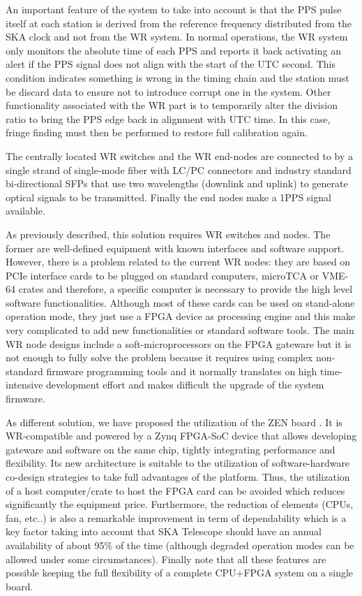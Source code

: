  
An important feature of the system to take into account is that the PPS pulse itself at each station is derived from the reference frequency distributed from the SKA clock and not from the WR system. In normal operations, the WR system only monitors the absolute time of each PPS and reports it back activating an alert if the PPS signal does not align with the start of the UTC second. This condition indicates something is wrong in the timing chain and the station must be discard data to ensure not to introduce corrupt one in the system. Other functionality associated with the WR part is to temporarily alter the division ratio to bring the PPS edge back in alignment with UTC time. In this case, fringe finding must then be performed to restore full calibration again.

The centrally located WR switches and the WR end-nodes are connected to by a single strand of single-mode fiber with LC/PC connectors and industry standard bi-directional SFPs that use two wavelengths (downlink and uplink) to generate optical signals to be transmitted. Finally the end nodes make a 1PPS signal available. 

As previously described, this solution requires WR switches and nodes. The former are well-defined equipment with known interfaces and software support. However, there is a problem related to the current WR nodes: they are based on PCIe interface cards to be plugged on standard computers, microTCA or VME-64 crates and therefore, a specific computer is necessary to provide the high level software functionalities. Although most of these cards can be used on stand-alone operation mode, they just use a FPGA device as processing engine and this make very complicated to add new functionalities or standard software tools. The main WR node designs include a soft-microprocessors on the FPGA gateware but it is not enough to fully solve the problem because it requires using complex non-standard firmware programming tools and it normally translates on high time-intensive development effort and makes difficult the upgrade of the system firmware.

As different solution, we have proposed the utilization of the ZEN board \cite{sevensols:wr_zen}. It is WR-compatible and powered by a Zynq FPGA-SoC device \cite{xilinx:zynq} that allows developing gateware and software on the same chip, tightly integrating performance and flexibility. Its new architecture is suitable to the utilization of software-hardware co-design strategies to take full advantages of the platform. Thus, the utilization of a host computer/crate to host the FPGA card can be avoided which reduces significantly the equipment price. Furthermore, the reduction of elements (CPUs, fan, etc..) is also a remarkable improvement in term of dependability which is a key factor taking into account that SKA Telescope should have an annual availability of about 95\% of the time (although degraded operation modes can be allowed under some circumstances). Finally note that all these features are possible keeping the full flexibility of a complete CPU+FPGA system on a single board. 

